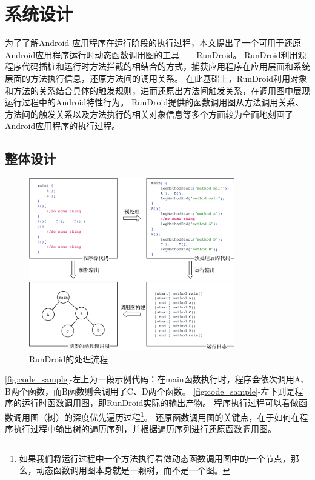 \chapter{系统设计}
\label{chp:design}





为了了解Android 应用程序在运行阶段的执行过程，本文提出了一个可用于还原Android应用程序运行时动态函数调用图的工具——RunDroid。
RunDroid利用源程序代码插桩和运行时方法拦截的相结合的方式，捕获应用程序在应用层面和系统层面的方法执行信息，还原方法间的调用关系。
在此基础上，RunDroid利用对象和方法的关系结合具体的触发规则，进而还原出方法间触发关系，在调用图中展现运行过程中的Android特性行为。
RunDroid提供的函数调用图从方法调用关系、方法间的触发关系以及方法执行的相关对象信息等多个方面较为全面地刻画了Android应用程序的执行过程。


\section{整体设计}



\begin{figure}[!ht]
	\centering
	\includegraphics[width=0.8\textwidth]{./Figures/code-sample.png}
	\caption{RunDroid的处理流程}
	\label{fig:code_sample}
\end{figure}


\autoref{fig:code_sample}-左上为一段示例代码：在main函数执行时，程序会依次调用A、B两个函数，而B函数则会调用了C、D两个函数。
\autoref{fig:code_sample}-左下则是程序的运行时函数调用图，即RunDroid实际的输出产物。
程序执行过程可以看做函数调用图（树）的深度优先遍历过程\footnote{如果我们将运行过程中一个方法执行看做动态函数调用图中的一个节点，那么，动态函数调用图本身就是一颗树，而不是一个图。}。
还原函数调用图的关键点，在于如何在程序执行过程中输出树的遍历序列，并根据遍历序列进行还原函数调用图。

